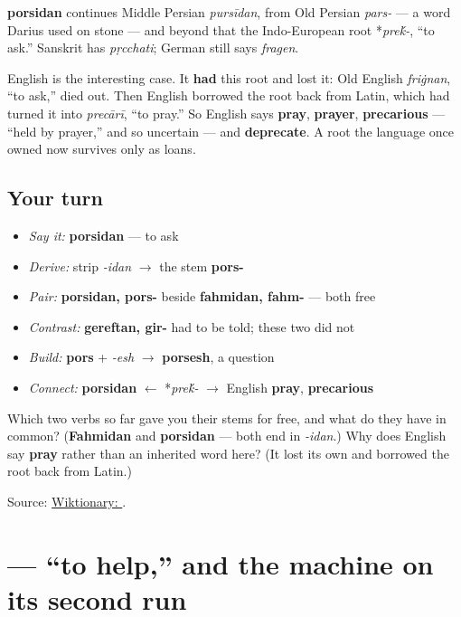 \begin{cousinweb}
\textbf{porsidan} continues Middle Persian \emph{pursīdan}, from Old Persian \emph{pars-} — a word Darius used on stone — and beyond that the Indo-European root *\emph{pre\'{k}-}, “to ask.” Sanskrit has \emph{pṛcchati}; German still says \emph{fragen}.

English is the interesting case. It \textbf{had} this root and lost it: Old English \emph{friġnan}, “to ask,” died out. Then English borrowed the root back from Latin, which had turned it into \emph{precārī}, “to pray.” So English says \textbf{pray}, \textbf{prayer}, \textbf{precarious} — “held by prayer,” and so uncertain — and \textbf{deprecate}. A root the language once owned now survives only as loans.
\end{cousinweb}

\subsection*{Your turn}
\begin{itemize}
\raggedright
  \item \emph{Say it:} \textbf{porsidan} — to ask
  \item \emph{Derive:} strip \emph{-idan} $\to$ the stem \textbf{pors-}
  \item \emph{Pair:} \textbf{porsidan, pors-} beside \textbf{fahmidan, fahm-} — both free
  \item \emph{Contrast:} \textbf{gereftan, gir-} had to be told; these two did not
  \item \emph{Build:} \textbf{pors} + \emph{-esh} $\to$ \textbf{porsesh}, a question
  \item \emph{Connect:} \textbf{porsidan} $\leftarrow$ *\emph{pre\'{k}-} $\to$ English \textbf{pray}, \textbf{precarious}
\end{itemize}

\begin{tcolorbox}[breakable,colback=teal!4,colframe=teal!35!black,title={Before you move on}]
Which two verbs so far gave you their stems for free, and what do they have in common? (\textbf{Fahmidan} and \textbf{porsidan} — both end in \emph{-idan}.) Why does English say \textbf{pray} rather than an inherited word here? (It lost its own and borrowed the root back from Latin.)

Source: \href{https://en.wiktionary.org/wiki/\%D9\%BE\%D8\%B1\%D8\%B3\%DB\%8C\%D8\%AF\%D9\%86}{Wiktionary: }.
\end{tcolorbox}
\section[\texorpdfstring{\fa{کمک} \fa{کردن} (komak kardan)}{کمک کردن (komak kardan)}]{  — “to help,” and the machine on its second run}

